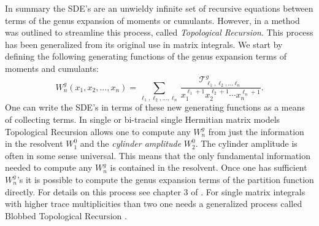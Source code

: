 \documentclass[10pt]{article}
\begin{document}
\begin{appendices}
	
	
	In summary the SDE's are an unwieldy infinite set of recursive equations between terms of the genus expansion of moments or cumulants. However, in \cite{Eynard TR} a method was outlined  to streamline this process, called \textit{Topological Recursion}. This process has been generalized  \cite{Eynard TR summary,Airy structures,Quantum Airy structures} from its original use in matrix integrals. We start by defining the following generating functions of the genus expansion terms of moments and cumulants:
	\begin{equation*}
		W^{g}_{n}(x_{1},x_{2},...,x_{n}) = \sum_{\ell_{1},\ell_{2},...,\ell_{n}} \frac{\mathcal{T}^{g}_{\ell_{1},\ell_{2},...\ell_{n} }}{x_{1}^{\ell_{1}+1}x_{2}^{\ell_{2}+1}\cdots x_{n}^{\ell_{n}+1}}.
	\end{equation*}
	One can write the SDE's in terms of these new generating functions as a means of collecting terms.  In single or bi-tracial single Hermitian matrix models Topological Recursion allows one to compute any  $	W^{g}_{n}$ from just the information in the resolvent $	W^{0}_{1}$ and the \textit{cylinder amplitude} $W^{0}_{2}$. The cylinder amplitude is often in some sense universal. This means that the only fundamental information needed to compute any  $	W^{g}_{n}$  is contained in the resolvent. Once one has sufficient $	W^{g}_{n}$'s it is possible to compute the genus expansion terms of the partition function directly. For details on this process see chapter 3 of \cite{Eynard2018}. For single matrix integrals with higher trace multiplicities than two one needs a generalized process called Blobbed Topological Recursion \cite{blobbed1,blobbed2}.
\end{appendices}
\end{document}
